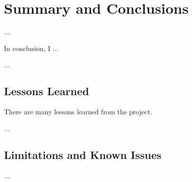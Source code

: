 
\chapter{Summary and Conclusions}
\label{chap:conclusions}

...

In conclusion, I ... 

...



\section{Lessons Learned}
\label{sec:lessons}

There are many lessons learned from the project.

...

\section{Limitations and Known Issues}
\label{sec:issues}

...


